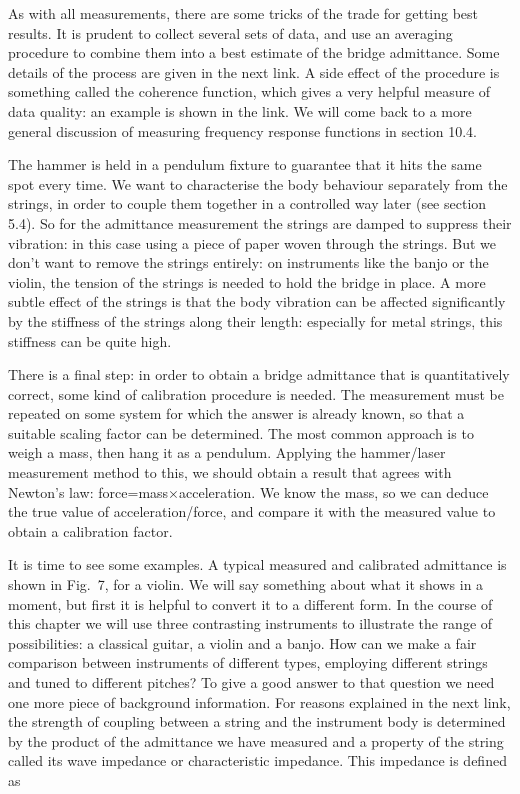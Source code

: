 
  As with all measurements, there are some tricks of the trade for getting best 
  results. It is prudent to collect several sets of data, and use an averaging 
  procedure to combine them into a best estimate of the bridge admittance. Some 
  details of the process are given in the next link. A side effect of the 
  procedure is something called the coherence function, which gives a very 
  helpful measure of data quality: an example is shown in the link. We will 
  come back to a more general discussion of measuring frequency response 
  functions in section 10.4. 

  The hammer is held in a pendulum fixture to guarantee that it hits the same 
  spot every time. We want to characterise the body behaviour separately from 
  the strings, in order to couple them together in a controlled way later (see 
  section 5.4). So for the admittance measurement the strings are damped to 
  suppress their vibration: in this case using a piece of paper woven through 
  the strings. But we don't want to remove the strings entirely: on instruments 
  like the banjo or the violin, the tension of the strings is needed to hold 
  the bridge in place. A more subtle effect of the strings is that the body 
  vibration can be affected significantly by the stiffness of the strings along 
  their length: especially for metal strings, this stiffness can be quite high. 

  There is a final step: in order to obtain a bridge admittance that is 
  quantitatively correct, some kind of calibration procedure is needed. The 
  measurement must be repeated on some system for which the answer is already 
  known, so that a suitable scaling factor can be determined. The most common 
  approach is to weigh a mass, then hang it as a pendulum. Applying the 
  hammer/laser measurement method to this, we should obtain a result that 
  agrees with Newton's law: force=mass$\times$acceleration. We know the mass, 
  so we can deduce the true value of acceleration/force, and compare it with 
  the measured value to obtain a calibration factor. 

  It is time to see some examples. A typical measured and calibrated admittance 
  is shown in Fig.\ 7, for a violin. We will say something about what it shows 
  in a moment, but first it is helpful to convert it to a different form. In 
  the course of this chapter we will use three contrasting instruments to 
  illustrate the range of possibilities: a classical guitar, a violin and a 
  banjo. How can we make a fair comparison between instruments of different 
  types, employing different strings and tuned to different pitches? To give a 
  good answer to that question we need one more piece of background 
  information. For reasons explained in the next link, the strength of coupling 
  between a string and the instrument body is determined by the product of the 
  admittance we have measured and a property of the string called its wave 
  impedance or characteristic impedance. This impedance is defined as 

